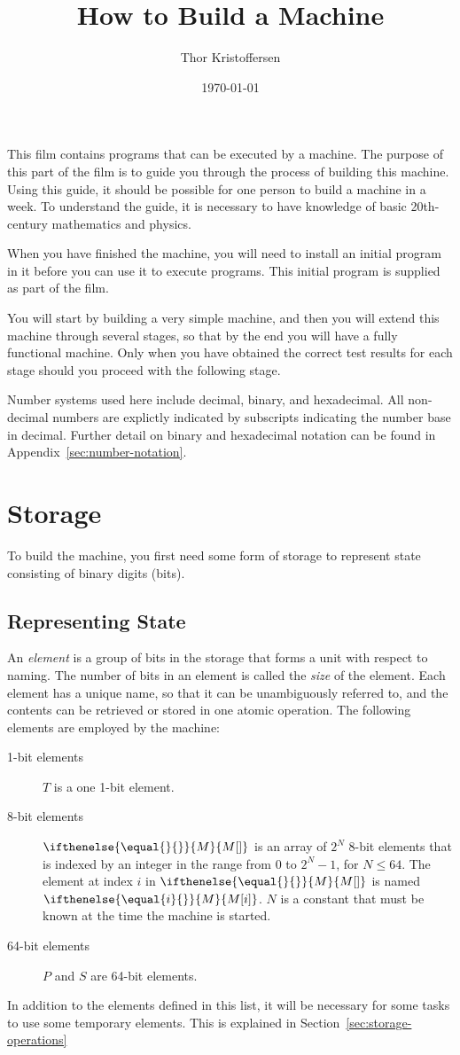 \documentclass[a4paper,12pt]{article}
\author{Thor Kristoffersen}
\date{\today}
\title{How to Build a Machine}
\newcommand{\MEM}[1]{\ifthenelse{\equal{#1}{}}{M}{M[#1]}}
\newcommand{\PC}{P}
\newcommand{\SP}{S}
\newcommand{\TERM}{T}
\begin{document}
\maketitle

\noindent
This film contains programs that can be executed by a machine.
The purpose of this part of the film is to guide you through the process of building this machine.
Using this guide, it should be possible for one person to build a machine in a week.
To understand the guide, it is necessary to have knowledge of basic 20th-century mathematics and physics.

When you have finished the machine, you will need to install an initial program in it before you can use it to execute programs.
This initial program is supplied as part of the film.

You will start by building a very simple machine, and then you will extend this machine through several stages, so that by the end you will have a fully functional machine.
Only when you have obtained the correct test results for each stage should you proceed with the following stage.

Number systems used here include decimal, binary, and hexadecimal.
All non-decimal numbers are explictly indicated by subscripts indicating the number base in decimal.
Further detail on binary and hexadecimal notation can be found in Appendix~\ref{sec:number-notation}.

\section{Storage}

To build the machine, you first need some form of storage to represent state consisting of binary digits (bits).

\subsection{Representing State}

An \emph{element} is a group of bits in the storage that forms a unit with respect to naming.
The number of bits in an element is called the \emph{size} of the element.
Each element has a unique name, so that it can be unambiguously referred to, and the contents can be retrieved or stored in one atomic operation.
The following elements are employed by the machine:
\begin{description}
\item[1-bit elements]
  $\TERM$ is a one 1-bit element.
\item[8-bit elements]
  $\MEM{}$ is an array of $2^N$ 8-bit elements that is indexed by an integer in the range from $0$ to $2^N - 1$, for $N \le 64$.
  The element at index $i$ in $\MEM{}$ is named $\MEM{i}$.
  $N$ is a constant that must be known at the time the machine is started.
\item[64-bit elements]
  $\PC$ and $\SP$ are 64-bit elements.
\end{description}
In addition to the elements defined in this list, it will be necessary for some tasks to use some temporary elements.
This is explained in Section~\ref{sec:storage-operations}
\end{document}
